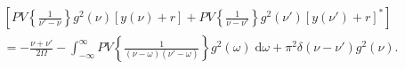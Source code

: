 \documentclass{article}
\begin{document}
\begin{equation}
\begin{split}
&\left[PV\left\{\frac{1}{\nu' - \nu}\right\}g^2(\nu)[y(\nu) + r] + PV\left\{\frac{1}{\nu - \nu'}\right\}g^2(\nu')[y(\nu') + r]^*\right]\\
&= -\frac{\nu + \nu'}{2\Omega} - \int_{-\infty}^\infty PV\left\{\frac{1}{(\nu - \omega)(\nu' - \omega)}\right\}g^2(\omega)\;\mathrm{d}\omega + \pi^2\delta(\nu - \nu')g^2(\nu).
\end{split}
\end{equation}
\end{document}
